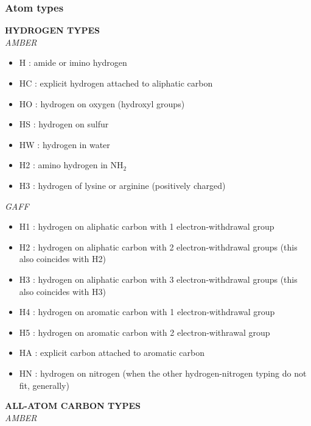 \documentclass[a4paper]{article}
\begin{document}
\subsubsection{Atom types}
\textbf{\normalsize HYDROGEN TYPES}\\
\hspace{3mm}\textit{\small AMBER}
\begin{itemize}
    \item H : amide or imino hydrogen 
    \item HC : explicit hydrogen attached to aliphatic carbon 
    \item HO : hydrogen on oxygen (hydroxyl groups)
    \item HS : hydrogen on sulfur 
    \item HW : hydrogen in water 
    \item H2 : amino hydrogen in NH$_2$
    \item H3 : hydrogen of lysine or arginine (positively charged)
\end{itemize}
\vspace{1.5mm}
\hspace{3mm}\textit{\small GAFF}
\begin{itemize}
    \item H1 : hydrogen on aliphatic carbon with 1 electron-withdrawal group
    \item H2 : hydrogen on aliphatic carbon with 2 electron-withdrawal groups (this also coincides with H2)
    \item H3 : hydrogen on aliphatic carbon with 3 electron-withdrawal groups (this also coincides with H3)
    \item H4 : hydrogen on aromatic carbon with 1 electron-withdrawal group
    \item H5 : hydrogen on aromatic carbon with 2 electron-withrawal group
    \item HA : explicit carbon attached to aromatic carbon
    \item HN : hydrogen on nitrogen (when the other hydrogen-nitrogen typing do not fit, generally)
\end{itemize}
\vspace{3mm}
%
%
%
\textbf{\normalsize ALL-ATOM CARBON TYPES}\\
\hspace{3mm}\textit{\small AMBER}
\end{document}
